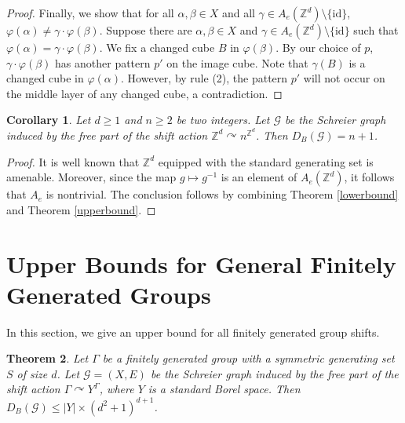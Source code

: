 \documentclass[11pt, reqno, a4paper]{amsart}
\theoremstyle{plain}
\newtheorem{theorem}{Theorem}[section]
\newtheorem{corollary}[theorem]{Corollary}
\theoremstyle{definition}
\theoremstyle{remark}
\begin{document}
\begin{proof}
Finally, we show that for all $\alpha,\beta\in X$ and all $\gamma\in A_e(\mathbb{Z}^d)\setminus\{\mathrm{id}\}$, $\varphi(\alpha)\ne\gamma\cdot\varphi(\beta)$. Suppose there are $\alpha,\beta\in X$ and $\gamma\in A_e(\mathbb{Z}^d)\setminus\{\mathrm{id}\}$ such that $\varphi(\alpha)=\gamma\cdot\varphi(\beta)$. We fix a changed cube $B$ in $\varphi(\beta)$. By our choice of $p$, $\gamma\cdot\varphi(\beta)$ has another pattern $p'$ on the image cube. Note that $\gamma(B)$ is a changed cube in $\varphi(\alpha)$. However, by rule (2), the pattern $p'$ will not occur on the middle layer of any changed cube, a contradiction.
\end{proof}
\begin{corollary}
Let $d\ge 1$ and $n\ge 2$ be two integers. Let $\mathcal{G}$ be the Schreier graph induced by the free part of the shift action $\mathbb{Z}^d \curvearrowright n^{\mathbb{Z}^d}$. Then $D_B(\mathcal{G}) = n+1$.
\end{corollary}
\begin{proof}
It is well known that $\mathbb{Z}^d$ equipped with the standard generating set is amenable. Moreover, since the map $g\longmapsto g^{-1}$ is an element of $A_e(\mathbb{Z}^d)$, it follows that $A_e$ is nontrivial. The conclusion follows by combining Theorem \ref{lowerbound} and Theorem \ref{upperbound}.
\end{proof}

\section{Upper Bounds for General Finitely Generated Groups}
In this section, we give an upper bound for all finitely generated group shifts.


\begin{theorem}\label{generalbound}
Let $\Gamma$ be a finitely generated group with a symmetric generating set $S$ of size $d$. Let $\mathcal{G}=(X,E)$ be the Schreier graph induced by the free part of the shift action $\Gamma \curvearrowright Y^\Gamma$, where $Y$ is a standard Borel space. Then $D_B(\mathcal{G}) \le |Y| \times (d^2+1)^{d+1}$. 
\end{theorem}
\end{document}
